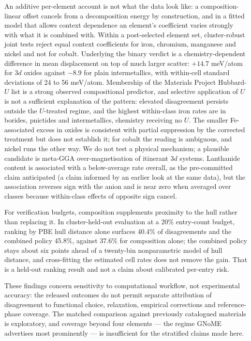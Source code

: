 \documentclass[11pt]{article}
\begin{document}
An additive per-element account is not what the data look like: a composition-linear
offset cancels from a decomposition energy by construction, and in a fitted model that
allows context dependence an element's coefficient varies strongly with what it is
combined with. Within a post-selected element set, cluster-robust joint tests reject
equal context coefficients for iron, chromium, manganese and nickel and not for
cobalt. Underlying the binary verdict is a chemistry-dependent
difference in mean displacement on top of much larger scatter: $+14.7$ meV/atom for 3$d$
oxides against $-8.9$ for plain intermetallics, with within-cell standard deviations of 24 to 56
meV/atom. Membership of the Materials Project Hubbard-$U$ list is a strong observed
compositional predictor, and selective application of $U$ is not a sufficient
explanation of the pattern: elevated disagreement persists outside the $U$-treated
regime, and the highest within-class iron rates are in borides, pnictides and
intermetallics, chemistry receiving no $U$. The smaller Fe-associated excess in oxides is consistent
with partial suppression by the corrected treatment but does not establish it; for cobalt
the reading is ambiguous, and nickel runs the other way. We do not test a physical mechanism; a plausible candidate is
meta-GGA over-magnetisation of itinerant 3$d$ systems. Lanthanide content is associated
with a below-average rate overall, as the pre-committed claim anticipated (a claim
informed by an earlier look at the same data), but the association reverses sign
with the anion and is near zero when averaged over classes because within-class effects
of opposite sign cancel.

For verification budgets, composition supplements proximity to the hull rather than
replacing it. In cluster-held-out evaluation at a 20\% entry-count budget, ranking by
PBE hull distance alone surfaces 40.4\% of disagreements and the combined policy
45.8\%, against 37.6\% for composition alone; the combined policy stays about six points
ahead of a twenty-bin nonparametric model of hull distance, and cross-fitting the
estimated cell rates does not remove the gain. That is a held-out ranking result and not
a claim about calibrated per-entry risk.

These findings concern sensitivity to computational workflow, not experimental
accuracy: the released outcomes do not permit separate attribution of disagreement to
functional choice, relaxation, empirical corrections and reference-phase coverage. The
matched comparison against previously catalogued materials is exploratory, and coverage
beyond four elements --- the regime GNoME advertises most prominently --- is
insufficient for the stratified claims made here.
\end{document}
